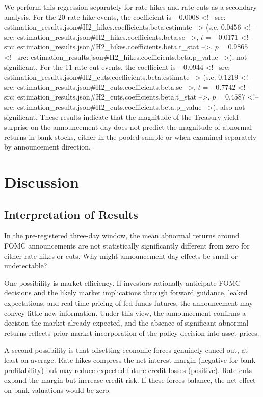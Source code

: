 \documentclass[11pt]{article}
\begin{document}
We perform this regression separately for rate hikes and rate cuts as a secondary analysis. For the 20 rate-hike events, the coefficient is $-0.0008$ <!-- src: estimation_results.json#H2_hikes.coefficients.beta.estimate --> (s.e. $0.0456$ <!-- src: estimation_results.json#H2_hikes.coefficients.beta.se -->, $t = -0.0171$ <!-- src: estimation_results.json#H2_hikes.coefficients.beta.t_stat -->, $p = 0.9865$ <!-- src: estimation_results.json#H2_hikes.coefficients.beta.p_value -->), not significant. For the 11 rate-cut events, the coefficient is $-0.0944$ <!-- src: estimation_results.json#H2_cuts.coefficients.beta.estimate --> (s.e. $0.1219$ <!-- src: estimation_results.json#H2_cuts.coefficients.beta.se -->, $t = -0.7742$ <!-- src: estimation_results.json#H2_cuts.coefficients.beta.t_stat -->, $p = 0.4587$ <!-- src: estimation_results.json#H2_cuts.coefficients.beta.p_value -->), also not significant. These results indicate that the magnitude of the Treasury yield surprise on the announcement day does not predict the magnitude of abnormal returns in bank stocks, either in the pooled sample or when examined separately by announcement direction.

\section{Discussion}\label{sec:discussion}

\subsection{Interpretation of Results}

In the pre-registered three-day window, the mean abnormal returns around FOMC announcements are not statistically significantly different from zero for either rate hikes or cuts. Why might announcement-day effects be small or undetectable?

One possibility is market efficiency. If investors rationally anticipate FOMC decisions and the likely market implications through forward guidance, leaked expectations, and real-time pricing of fed funds futures, the announcement may convey little new information. Under this view, the announcement confirms a decision the market already expected, and the absence of significant abnormal returns reflects prior market incorporation of the policy decision into asset prices.

A second possibility is that offsetting economic forces genuinely cancel out, at least on average. Rate hikes compress the net interest margin (negative for bank profitability) but may reduce expected future credit losses (positive). Rate cuts expand the margin but increase credit risk. If these forces balance, the net effect on bank valuations would be zero.
\end{document}
